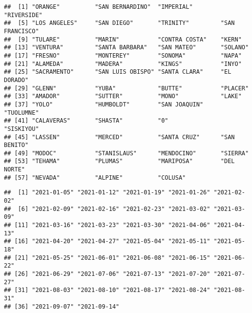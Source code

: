 \documentclass[
]{article}
\newenvironment{Shaded}{\begin{snugshade}}{\end{snugshade}}
\newcommand{\KeywordTok}[1]{\textcolor[rgb]{0.13,0.29,0.53}{\textbf{#1}}}
\newcommand{\NormalTok}[1]{#1}
\newcommand{\OperatorTok}[1]{\textcolor[rgb]{0.81,0.36,0.00}{\textbf{#1}}}
\newcommand{\StringTok}[1]{\textcolor[rgb]{0.31,0.60,0.02}{#1}}
\begin{document}
\begin{verbatim}
##  [1] "ORANGE"          "SAN BERNARDINO"  "IMPERIAL"        "RIVERSIDE"      
##  [5] "LOS ANGELES"     "SAN DIEGO"       "TRINITY"         "SAN FRANCISCO"  
##  [9] "TULARE"          "MARIN"           "CONTRA COSTA"    "KERN"           
## [13] "VENTURA"         "SANTA BARBARA"   "SAN MATEO"       "SOLANO"         
## [17] "FRESNO"          "MONTEREY"        "SONOMA"          "NAPA"           
## [21] "ALAMEDA"         "MADERA"          "KINGS"           "INYO"           
## [25] "SACRAMENTO"      "SAN LUIS OBISPO" "SANTA CLARA"     "EL DORADO"      
## [29] "GLENN"           "YUBA"            "BUTTE"           "PLACER"         
## [33] "AMADOR"          "SUTTER"          "MONO"            "LAKE"           
## [37] "YOLO"            "HUMBOLDT"        "SAN JOAQUIN"     "TUOLUMNE"       
## [41] "CALAVERAS"       "SHASTA"          "0"               "SISKIYOU"       
## [45] "LASSEN"          "MERCED"          "SANTA CRUZ"      "SAN BENITO"     
## [49] "MODOC"           "STANISLAUS"      "MENDOCINO"       "SIERRA"         
## [53] "TEHAMA"          "PLUMAS"          "MARIPOSA"        "DEL NORTE"      
## [57] "NEVADA"          "ALPINE"          "COLUSA"
\end{verbatim}

\begin{Shaded}
\end{Shaded}

\begin{verbatim}
##  [1] "2021-01-05" "2021-01-12" "2021-01-19" "2021-01-26" "2021-02-02"
##  [6] "2021-02-09" "2021-02-16" "2021-02-23" "2021-03-02" "2021-03-09"
## [11] "2021-03-16" "2021-03-23" "2021-03-30" "2021-04-06" "2021-04-13"
## [16] "2021-04-20" "2021-04-27" "2021-05-04" "2021-05-11" "2021-05-18"
## [21] "2021-05-25" "2021-06-01" "2021-06-08" "2021-06-15" "2021-06-22"
## [26] "2021-06-29" "2021-07-06" "2021-07-13" "2021-07-20" "2021-07-27"
## [31] "2021-08-03" "2021-08-10" "2021-08-17" "2021-08-24" "2021-08-31"
## [36] "2021-09-07" "2021-09-14"
\end{verbatim}
\end{document}
